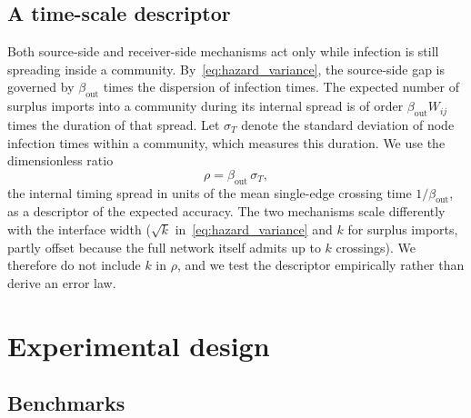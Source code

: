 \documentclass[a4paper,fleqn]{cas-sc}
\begin{document}
\subsection{A time-scale descriptor}
\label{sec:descriptor}

Both source-side and receiver-side mechanisms act only while infection is still spreading inside a community. By~\eqref{eq:hazard_variance}, the source-side gap is governed by $\beta_{\mathrm{out}}$ times the dispersion of infection times. The expected number of surplus imports into a community during its internal spread is of order $\beta_{\mathrm{out}}W_{ij}$ times the duration of that spread. Let $\sigma_T$ denote the standard deviation of node infection times within a community, which measures this duration. We use the dimensionless ratio
\begin{equation}
\label{eq:rho}
\rho=\beta_{\mathrm{out}}\,\sigma_T,
\end{equation}
the internal timing spread in units of the mean single-edge crossing time $1/\beta_{\mathrm{out}}$, as a descriptor of the expected accuracy. The two mechanisms scale differently with the interface width ($\sqrt{k}$ in~\eqref{eq:hazard_variance} and $k$ for surplus imports, partly offset because the full network itself admits up to $k$ crossings). We therefore do not include $k$ in $\rho$, and we test the descriptor empirically rather than derive an error law.

\section{Experimental design}
\label{sec:design}

\subsection{Benchmarks}
\end{document}
